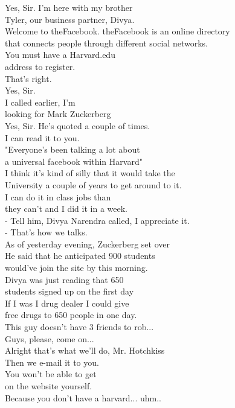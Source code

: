 \documentclass{article}
\begin{document}
\begin{multicols}{3}
Yes, Sir. I'm here with my brother\\
Tyler, our business partner, Divya.\\
Welcome to theFacebook. theFacebook is an online directory\\
that connects people through different social networks.\\
You must have a Harvard.edu\\
address to register.\\
That's right.\\
Yes, Sir.\\
I called earlier, I'm\\
looking for Mark Zuckerberg\\
Yes, Sir. He's quoted a couple of times.\\
I can read it to you.\\
"Everyone's been talking a lot about\\
a universal facebook within Harvard"\\
I think it's kind of silly that it would take the\\
University a couple of years to get around to it.\\
I can do it in class jobs than\\
they can't and I did it in a week.\\
- Tell him, Divya Narendra called, I appreciate it.\\
- That's how we talks.\\
As of yesterday evening, Zuckerberg set over\\
He said that he anticipated 900 students\\
would've join the site by this morning.\\
Divya was just reading that 650\\
students signed up on the first day\\
If I was I drug dealer I could give\\
free drugs to 650 people in one day.\\
This guy doesn't have 3 friends to rob...\\
Guys, please, come on...\\
Alright that's what we'll do, Mr. Hotchkiss\\
Then we e-mail it to you.\\
You won't be able to get\\
on the website yourself.\\
Because you don't have a harvard... uhm..\\

\end{multicols}
\end{document}

